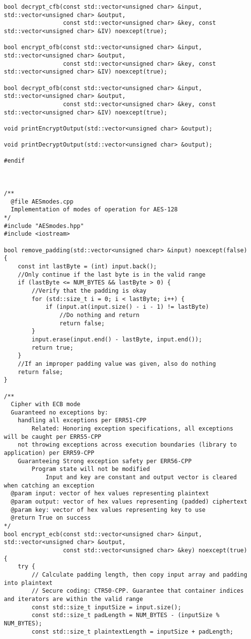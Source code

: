\documentclass[a4paper,12pt]{article}
\begin{document}
{\begin{lstlisting}
bool decrypt_cfb(const std::vector<unsigned char> &input, std::vector<unsigned char> &output,
                 const std::vector<unsigned char> &key, const std::vector<unsigned char> &IV) noexcept(true);

bool encrypt_ofb(const std::vector<unsigned char> &input, std::vector<unsigned char> &output,
                 const std::vector<unsigned char> &key, const std::vector<unsigned char> &IV) noexcept(true);

bool decrypt_ofb(const std::vector<unsigned char> &input, std::vector<unsigned char> &output,
                 const std::vector<unsigned char> &key, const std::vector<unsigned char> &IV) noexcept(true);

void printEncryptOutput(std::vector<unsigned char> &output);

void printDecryptOutput(std::vector<unsigned char> &output);

#endif



/**
  @file AESmodes.cpp
  Implementation of modes of operation for AES-128
*/
#include "AESmodes.hpp"
#include <iostream>

bool remove_padding(std::vector<unsigned char> &input) noexcept(false) {
    const int lastByte = (int) input.back();
    //Only continue if the last byte is in the valid range
    if (lastByte <= NUM_BYTES && lastByte > 0) {
        //Verify that the padding is okay
        for (std::size_t i = 0; i < lastByte; i++) {
            if (input.at(input.size() - i - 1) != lastByte)
                //Do nothing and return
                return false;
        }
        input.erase(input.end() - lastByte, input.end());
        return true;
    }
    //If an improper padding value was given, also do nothing
    return false;
}

/**
  Cipher with ECB mode
  Guaranteed no exceptions by:
    handling all exceptions per ERR51-CPP
        Related: Honoring exception specifications, all exceptions will be caught per ERR55-CPP
    not throwing exceptions across execution boundaries (library to application) per ERR59-CPP
    Guaranteeing Strong exception safety per ERR56-CPP
        Program state will not be modified
            Input and key are constant and output vector is cleared when catching an exception
  @param input: vector of hex values representing plaintext
  @param output: vector of hex values representing (padded) ciphertext
  @param key: vector of hex values representing key to use
  @return True on success
*/
bool encrypt_ecb(const std::vector<unsigned char> &input, std::vector<unsigned char> &output,
                 const std::vector<unsigned char> &key) noexcept(true) {
    try {
        // Calculate padding length, then copy input array and padding into plaintext
        // Secure coding: CTR50-CPP. Guarantee that container indices and iterators are within the valid range
        const std::size_t inputSize = input.size();
        const std::size_t padLength = NUM_BYTES - (inputSize % NUM_BYTES);
        const std::size_t plaintextLength = inputSize + padLength;


\end{lstlisting}}
\end{document}

